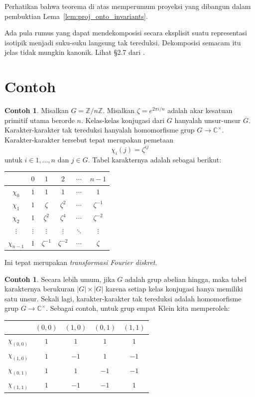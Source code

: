 \documentclass[12pt]{article}
\theoremstyle{plain}
\theoremstyle{definition}
\newtheorem{example}[theorem]{Contoh}
\theoremstyle{remark}
\numberwithin{equation}{section}
\begin{document}
Perhatikan bahwa teorema di atas memperumum proyeksi yang dibangun dalam
pembuktian Lema~\ref{lem:proj_onto_invariants}.

Ada pula rumus yang dapat mendekomposisi secara eksplisit suatu
representasi isotipik menjadi suku-suku langsung tak tereduksi.
Dekomposisi semacam itu jelas tidak mungkin kanonik.
Lihat \S 2.7 dari \cite{Serre}.

\section{Contoh}

\begin{example}
Misalkan $G = \mathbb{Z}/n\mathbb{Z}$. Misalkan $\zeta = e^{2\pi i/n}$
adalah akar kesatuan primitif utama berorde $n$.
Kelas-kelas konjugasi dari $G$ hanyalah unsur-unsur $G$.
Karakter-karakter tak tereduksi hanyalah
homomorfisme grup $G \to \mathbb{C}^\times$.
Karakter-karakter tersebut tepat merupakan pemetaan
\[
\chi_i(j) = \zeta^{ij}
\]
untuk $i \in 1,\ldots,n$ dan $j \in G$.
Tabel karakternya adalah sebagai berikut:
\begin{center}
\begin{tabular}{|c|c|c|c|c|c|}
\hline 
 & $0 $ & $1$ & $2$ & $\cdots$ & ${n-1}$\\
\hline 
\hline 
$\chi_0$ & $1$ & $1$ & $1$ & $\cdots$ & $1$\\
\hline 
$\chi_1$ & $1$ & $\zeta$ & $\zeta^2$ & $\cdots$ & $\zeta^{-1}$\\
\hline 
$\chi_2$ & $1$ & $\zeta^2$ & $\zeta^4$ & $\cdots$ & $\zeta^{-2}$\\
\hline 
$\vdots$ & $\vdots$ & $\vdots$ & $\vdots$ & $\ddots$ & $\vdots$\\
\hline 
$\chi_{n-1}$ & $1$ & $\zeta^{-1}$ & $\zeta^{-2}$ & $\cdots$ & $\zeta$\\
\hline
\end{tabular}
\end{center}
Ini tepat merupakan \emph{transformasi Fourier diskret}.
\end{example}

\begin{example}
Secara lebih umum, jika $G$ adalah grup abelian hingga, maka
tabel karakternya berukuran $|G| \times |G|$ karena setiap kelas konjugasi hanya memiliki
satu unsur.
Sekali lagi, karakter-karakter tak tereduksi adalah homomorfisme grup
$G \to \mathbb{C}^\times$.
Sebagai contoh, untuk grup empat Klein kita memperoleh:
\begin{center}
\begin{tabular}{|c|c|c|c|c|}
\hline 
 & $(0,0)$ & $(1,0)$ & $(0,1)$ & $(1,1)$\\
\hline 
\hline 
$\chi_{(0,0)}$ & $1$ & $1$ & $1$ & $1$\\
\hline 
$\chi_{(1,0)}$ & $1$ & $-1$ & $1$ & $-1$\\
\hline 
$\chi_{(0,1)}$ & $1$ & $1$ & $-1$ & $-1$\\
\hline 
$\chi_{(1,1)}$ & $1$ & $-1$ & $-1$ & $1$\\
\hline
\end{tabular}
\end{center}
\end{example}
\end{document}
